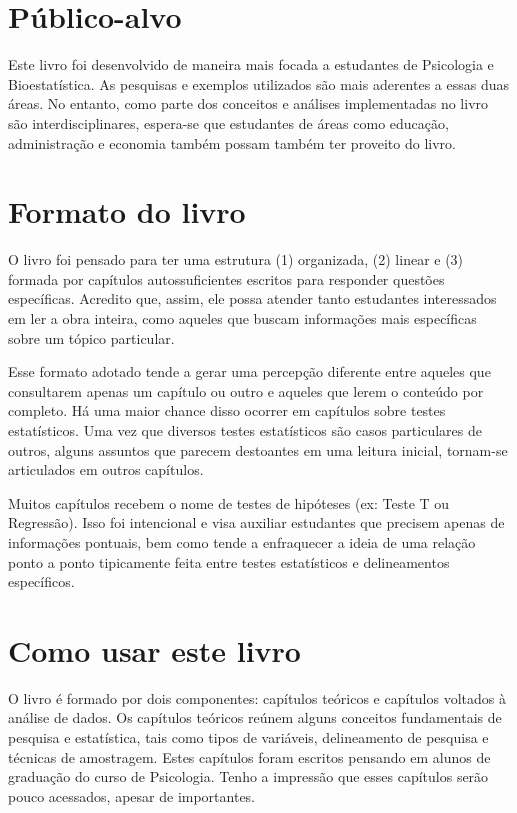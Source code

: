 \documentclass[
]{book}
\begin{document}
\hypertarget{puxfablico-alvo}{%
\section{Público-alvo}\label{puxfablico-alvo}}

Este livro foi desenvolvido de maneira mais focada a estudantes de Psicologia e Bioestatística. As pesquisas e exemplos utilizados são mais aderentes a essas duas áreas. No entanto, como parte dos conceitos e análises implementadas no livro são interdisciplinares, espera-se que estudantes de áreas como educação, administração e economia também possam também ter proveito do livro.

\hypertarget{formato-do-livro}{%
\section{Formato do livro}\label{formato-do-livro}}

O livro foi pensado para ter uma estrutura (1) organizada, (2) linear e (3) formada por capítulos autossuficientes escritos para responder questões específicas. Acredito que, assim, ele possa atender tanto estudantes interessados em ler a obra inteira, como aqueles que buscam informações mais específicas sobre um tópico particular.

Esse formato adotado tende a gerar uma percepção diferente entre aqueles que consultarem apenas um capítulo ou outro e aqueles que lerem o conteúdo por completo. Há uma maior chance disso ocorrer em capítulos sobre testes estatísticos. Uma vez que diversos testes estatísticos são casos particulares de outros, alguns assuntos que parecem destoantes em uma leitura inicial, tornam-se articulados em outros capítulos.

Muitos capítulos recebem o nome de testes de hipóteses (ex: Teste T ou Regressão). Isso foi intencional e visa auxiliar estudantes que precisem apenas de informações pontuais, bem como tende a enfraquecer a ideia de uma relação ponto a ponto tipicamente feita entre testes estatísticos e delineamentos específicos.

\hypertarget{como-usar-este-livro}{%
\section{Como usar este livro}\label{como-usar-este-livro}}

O livro é formado por dois componentes: capítulos teóricos e capítulos voltados à análise de dados. Os capítulos teóricos reúnem alguns conceitos fundamentais de pesquisa e estatística, tais como tipos de variáveis, delineamento de pesquisa e técnicas de amostragem. Estes capítulos foram escritos pensando em alunos de graduação do curso de Psicologia. Tenho a impressão que esses capítulos serão pouco acessados, apesar de importantes.
\end{document}
